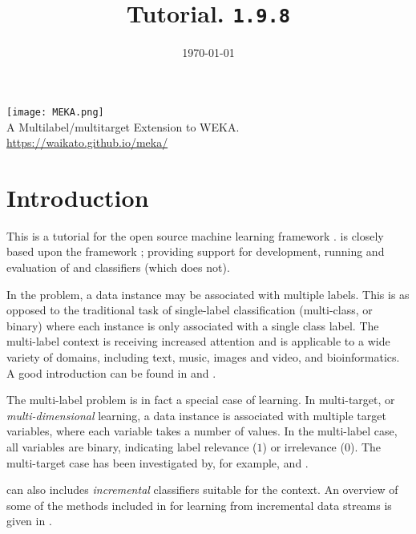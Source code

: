 \documentclass[11pt]{article}
\newcommand{\MEKA}{Meka}
\newcommand{\WEKA}{Weka}
\def\version{{\tt 1.9.8}}
\begin{document}
\title{Tutorial. \framework{\MEKA} \version }


\date{\mydate\today}

\maketitle

\begin{center}
	\texttt{[image: MEKA.png]}\\
		A Multilabel/multitarget Extension to WEKA.\\
		\url{https://waikato.github.io/meka/}
\end{center}

\tableofcontents

\thispagestyle{empty}
\pagebreak

\section{Introduction}

This is a tutorial for the open source machine learning framework \framework{\MEKA}. \framework{\MEKA} is closely based upon the \framework{\WEKA} framework \cite{WEKA}; providing support for development, running and evaluation of  and  classifiers (which  does not).

In the  problem, a data instance may be associated with multiple labels. This is as opposed to the traditional task of single-label classification (\ie multi-class, or binary) where each instance is only associated with a single class label. The multi-label context is receiving increased attention and is applicable to a wide variety of domains, including text, music, images and video, and bioinformatics. A good introduction can be found in \cite{MMD} and \cite{Thesis}.

The multi-label problem is in fact a special case of  learning. In multi-target, or \textit{multi-dimensional} learning, a data instance is associated with multiple target variables, where each variable takes a number of values. In the multi-label case, all variables are binary, indicating label relevance ($1$) or irrelevance ($0$). The multi-target case has been investigated by, for example, \cite{UPM} and \cite{MT}.  

\framework{\MEKA} can also includes \emph{incremental} classifiers suitable for the  context. An overview of some of the methods included in \framework{\MEKA} for learning from incremental data streams is given in \cite{MEDS2}.
\end{document}
